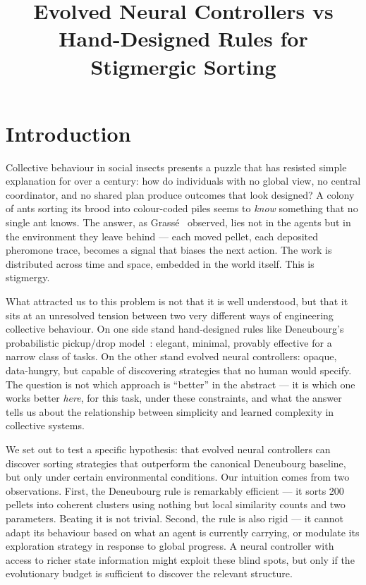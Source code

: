 \documentclass[11pt,a4paper]{article}
\title{Evolved Neural Controllers vs Hand-Designed Rules for Stigmergic Sorting}
\author{}
\date{}
\begin{document}
\maketitle

\begin{abstract}
\end{abstract}

\section{Introduction}

Collective behaviour in social insects presents a puzzle that has resisted simple explanation for over a century: how do individuals with no global view, no central coordinator, and no shared plan produce outcomes that look designed? A colony of ants sorting its brood into colour-coded piles seems to \emph{know} something that no single ant knows. The answer, as Grass\'e~\cite{grasse1959} observed, lies not in the agents but in the environment they leave behind --- each moved pellet, each deposited pheromone trace, becomes a signal that biases the next action. The work is distributed across time and space, embedded in the world itself. This is stigmergy.

What attracted us to this problem is not that it is well understood, but that it sits at an unresolved tension between two very different ways of engineering collective behaviour. On one side stand hand-designed rules like Deneubourg's probabilistic pickup/drop model~\cite{deneubourg1990}: elegant, minimal, provably effective for a narrow class of tasks. On the other stand evolved neural controllers: opaque, data-hungry, but capable of discovering strategies that no human would specify. The question is not which approach is ``better'' in the abstract --- it is which one works better \emph{here}, for this task, under these constraints, and what the answer tells us about the relationship between simplicity and learned complexity in collective systems.

We set out to test a specific hypothesis: that evolved neural controllers can discover sorting strategies that outperform the canonical Deneubourg baseline, but only under certain environmental conditions. Our intuition comes from two observations. First, the Deneubourg rule is remarkably efficient --- it sorts 200 pellets into coherent clusters using nothing but local similarity counts and two parameters. Beating it is not trivial. Second, the rule is also rigid --- it cannot adapt its behaviour based on what an agent is currently carrying, or modulate its exploration strategy in response to global progress. A neural controller with access to richer state information might exploit these blind spots, but only if the evolutionary budget is sufficient to discover the relevant structure.
\end{document}
